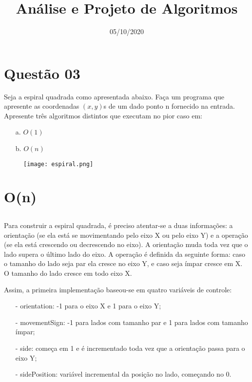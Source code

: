 \documentclass[12pt,a4paper]{article}
\title{Análise e Projeto de Algoritmos}
\date{05/10/2020}
\begin{document}
\section*{Questão 03}
Seja a espiral quadrada como apresentada abaixo. Faça um programa que apresente as coordenadas $(x, y)$s de um dado ponto n fornecido na entrada. Apresente três algoritmos distintos que executam no pior caso em:
\begin{enumerate}
    \item[a.] $O(1)$
    \item[b.] $O(n)$
\end{enumerate}

 \begin{figure}[ht]
    \centering
    \texttt{[image: espiral.png]}
    \label{espiral}
\end{figure}

\section{O(n)}

    \subsection{}
       Para construir a espiral quadrada, é preciso atentar-se a duas informações: a orientação (se ela está se movimentando pelo eixo X ou pelo eixo Y) e a operação (se ela está crescendo ou decrescendo no eixo). A orientação muda toda vez que o lado supera o último lado do eixo. A operação é definida da seguinte forma: caso o tamanho do lado seja par ela cresce no eixo Y, e caso seja ímpar cresce em X. O tamanho do lado cresce em todo eixo X. 
       
       Assim, a primeira implementação baseou-se em quatro variáveis de controle:
        \begin{itemize}
        	\item[-] orientation: -1 para o eixo X e 1 para o eixo Y;
        	\item[-] movementSign: -1 para lados com tamanho par e 1 para lados com tamanho ímpar;
        	\item[-] side: começa em 1 e é incrementado toda vez que a orientação passa para o eixo Y;
        	\item[-] sidePosition: variável incremental da posição no lado, começando no 0.
    	\end{itemize}
    	
\end{document}
